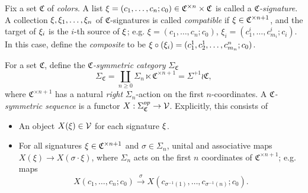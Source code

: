\documentclass[a4paper,10pt
,draft
]{article}%
\renewcommand{\1}{\eta}%
\begin{document}
\begin{definition}
      Fix a set $\mathfrak C$ of \textit{colors}.
      A list
      $\xi = (c_1, \ldots, c_n; c_0) \in \mathfrak C^{\times n} \times \mathfrak C$
      is called a \textit{$\mathfrak C$-signature}.
      A collection $\xi, \xi_1,\dots, \xi_n$ of $\mathfrak C$-signatures is called \textit{compatible} if
      $\xi \in \mathfrak C^{\times n+1}$, and the target of $\xi_i$ is the $i$-th source of $\xi$;
      e.g.  $\xi = (c_1, \ldots, c_n; c_0)$, $\xi_i = (c_{1}^i, \ldots, c_{m_i}^i; c_i)$.
      In this case, define the \textit{composite} to be $\xi \circ (\xi_i) = (c_1^1,c_2^1,\dots,c_{m_n}^{n}; c_0)$.
\end{definition}

\begin{definition}
      For a set $\mathfrak C$, define the \textit{$\mathfrak C$-symmetric category} $\Sigma_{\mathfrak C}$
      \begin{equation}
            \Sigma_{\mathfrak C} = \coprod_{n \geq 0} \Sigma_n \ltimes \mathfrak C^{\times n+1} = \Sigma^{+1} \wr \mathfrak C,
      \end{equation}
      where $\mathfrak C^{\times n+1}$ has a natural \textit{right} $\Sigma_n$-action on the first $n$-coordinates.
      A \textit{$\mathfrak C$-symmetric sequence} is a functor $X: \Sigma_{\mathfrak C}^{op} \to \mathcal V$.
      Explicitly, this consists of
      \begin{itemize} %
      \item An object $X(\xi) \in \mathcal V$ for each signature $\xi$.
      \item For all signatures $\xi \in \mathfrak C^{\times n+1}$ and $\sigma \in \Sigma_n$,
            unital and associative maps $X(\xi) \to X(\sigma \cdot \xi)$,
            where $\Sigma_n$ acts on the first $n$ coordinates of $\mathfrak C^{\times n+1}$;
            e.g. maps
            \begin{equation}
                  X(c_1, \ldots, c_n; c_0) \xrightarrow{\sigma} X(c_{\sigma^{-1}(1)}, \ldots, c_{\sigma^{-1}(n)}; c_0).
            \end{equation}
      \end{itemize}
\end{definition}
\end{document}
